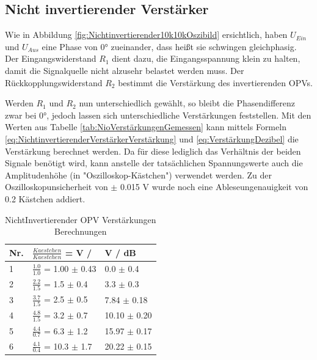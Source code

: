 \documentclass[12pt,a4paper,twoside]{article}
\begin{document}
\subsection{Nicht invertierender Verstärker}

Wie in Abbildung \ref{fig:Nichtinvertierender10k10kOszibild} ersichtlich, haben $U_{Ein}$ und $U_{Aus}$ eine Phase von 0° zueinander, dass heißt sie schwingen gleichphasig.
Der Eingangswiderstand $R_{1}$ dient dazu, die Eingangsspannung klein zu halten, damit die Signalquelle nicht alzusehr belastet werden muss. Der Rückkopplungswiderstand $R_{2}$ bestimmt die Verstärkung des invertierenden OPVs. \newline

\noindent
Werden $R_{1}$ und $R_{2}$ nun unterschiedlich gewählt, so bleibt die Phasendifferenz zwar bei 0°, jedoch lassen sich unterschiedliche Verstärkungen feststellen. 
Mit den Werten aus Tabelle \ref{tab:NioVerstärkungenGemessen} kann mittels Formeln \ref{eq:NichtinvertierenderVerstärkerVerstärkung} und \ref{eq:VerstärkungDezibel} die Verstärkung berechnet werden. Da für diese lediglich das Verhältnis der beiden Signale benötigt wird, kann anstelle der tatsächlichen Spannungswerte auch die Amplitudenhöhe (in "Oszilloskop-Kästchen") verwendet werden.
Zu der Oszilloskopunsicherheit von $\pm$ 0.015 V wurde noch eine Ableseungenauigkeit von 0.2 Kästchen addiert.

\begin{table}[H]
    \centering
    \caption{NichtInvertierender OPV Verstärkungen Berechnungen}
    \label{tab:NioVerstärkungenBerechnet}
    \begin{tabular}{| l | l | l |}
        \hline
        Nr. & $\frac{Kaestchen}{Kaestchen}$ = V / & V / dB \\
        \hline
        1 & $\frac{1.0}{1.0}$ =  1.00 $\pm$ 0.43 & 0.0    $\pm$ 0.4 \\
        2 & $\frac{2.2}{1.5}$ =  1.5 $\pm$ 0.4 & 3.3 $\pm$ 0.3 \\
        3 & $\frac{3.7}{1.5}$ =  2.5 $\pm$ 0.5 & 7.84 $\pm$ 0.18 \\
        4 & $\frac{4.8}{1.5}$ =  3.2 $\pm$ 0.7 & 10.10 $\pm$ 0.20 \\
        5 & $\frac{4.4}{0.7}$ =  6.3 $\pm$ 1.2 & 15.97 $\pm$ 0.17 \\
        6 & $\frac{4.1}{0.4}$ = 10.3 $\pm$ 1.7 & 20.22 $\pm$ 0.15 \\
        \hline
    \end{tabular}
\end{table}
\end{document}
